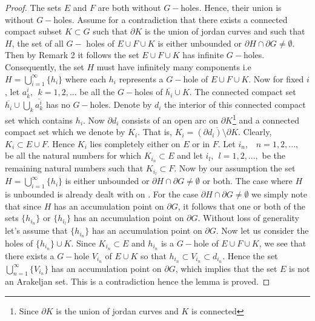 \documentclass[12pt]{article}
\begin{document}
\begin{proof}
The sets $E$ and $F$ are both without $G-$holes. Hence, their union is without $G-$holes. Assume for a contradiction that there exists a connected compact subset $K\subset G$ such that $\partial K$ is the union of jordan curves and such that $H$, the set of all $G-$ holes of $E\cup F\cup K$ is either unbounded or $\partial H\cap \partial G\not=\emptyset$. Then by {Remark 2} it follows the set $E\cup F\cup K$ has infinite $G-$holes. Consequently, the set $H$ must have infinitely many components i.e $H=\bigcup_{i=1}^\infty \lbrace h_i\rbrace$ where each $h_i$ represents a $G-$hole of $E\cup F\cup K$. Now for fixed $i$, let $a_k^i,\ \ k=1,2,...$ be all the $G-$holes of $\overline{h_i}\cup K$. The connected compact set $\overline{h_i}\cup\bigcup_k \overline{ a_k^i} $ has no $G-$holes. Denote by $d_i$ the interior of this connected compact set which contains $h_i$. Now $\partial d_i$ consists of an open arc on $\partial K$\footnote{Since $\partial K$ is the union of jordan curves and $K$ is connected} and a connected compact set which we denote by $K_i$. That is, $K_i=\overline{(\partial d_i)\setminus\partial K}.$ Clearly, $K_i\subset E\cup F$. Hence $K_i$ lies completely either on $E$ or in $F$. Let $i_n$,\ \ $n=1,2,...,$ be all the natural numbers for which $K_{i_n}\subset E$ and let $i_l,\ \ l=1,2,...,$ be the remaining natural numbers such that $K_{i_l}\subset F$. Now by our assumption the set $H=\bigcup_{i=1}^\infty \lbrace h_i\rbrace$ is either unbounded or $\partial H\cap \partial G\not=\emptyset$ or both. The case where $H$ is unbounded is already dealt with on \cite{RU}. For the case $\partial H\cap \partial G\not=\emptyset$ we simply note that since $H$ has an accumulation point on $\partial G$, it follows that one or both of the sets $\lbrace h_{i_n}\rbrace $ or $\lbrace h_{i_l}\rbrace$ has an accumulation point on $\partial G$. Without loss of generality let's assume that $\lbrace h_{i_n}\rbrace $ has an accumulation point on $\partial G$. Now let us consider the holes of $\lbrace h_{i_n}\rbrace \cup K$. Since $K_{i_n}\subset E$ and $h_{i_n}$ is a $G-$hole of $E\cup F\cup K$, we see that there exists a $G-$hole $V_{i_n}$ of $E\cup K$ so that $h_{i_n}\subset V_{i_n}\subset d_{i_n}$. Hence the set $\bigcup_{n=1}^\infty\lbrace V_{i_n}\rbrace$ has an accumulation point on $\partial G$, which implies that the set $E$ is not an Arakeljan set. This is a contradiction hence the lemma is proved.
\end{proof}
\end{document}
